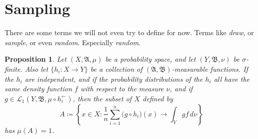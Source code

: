 \documentclass[
twoside=true,
paper=letter,
fontsize=11pt,
pagesize=auto,
leqno,
openany,
headsepline,
overfullrule,
]{scrbook}
\theoremstyle{plain}
\theoremstyle{plain}
\newtheorem{prop}[thm]{Proposition}
\theoremstyle{definition}
\theoremstyle{bfnoteitalic}
\theoremstyle{bfnoteroman}
\newcommand{\sigalg}[1]{\mathfrak{#1}}
\newcommand{\cali}[1]{\mathscr{#1}}
\newcommand{\definedby}{\coloneqq}
\newcommand{\textsigma}{\hbox{\large{$\sigma$}}\kern-1pt}
\newcommand{\preimage}[1]{#1^{\leftarrow}}
\newcommand{\sigmaalgebra}{\sigalg{A}}
\newcommand{\sigmaalgebraii}{\sigalg{B}}
\newcommand{\funcf}{f}
\newcommand{\funcg}{g}
\newcommand{\funch}{h}
\newcommand{\function}{f}
\newcommand{\functionii}{g}
\newcommand{\functioniii}{h}
\newcommand{\measurespace}{X}
\newcommand{\measurespaceii}{Y}
\newcommand{\mspaceelt}{x}
\newcommand{\measure}{\mu}
\newcommand{\measmu}{\mu}
\newcommand{\measnu}{\nu}
\newcommand{\seti}{A}
\begin{document}
\section{Sampling}
There are some terms we will not even try to define for now.
Terms like \emph{draw}, or \emph{sample}, or even \emph{random}. Especially \emph{random}.



\begin{prop}\label{sampling}
Let $(\measurespace,\sigmaalgebra,\measmu)$ be a probability space, and let 
$(\measurespaceii,\sigmaalgebraii,\measnu)$ be \textsigma-finite.
Also let
$\{ \funch_i:\measurespace\to\measurespaceii \}$ be a collection of 
$(\sigmaalgebra,\sigmaalgebraii)$\hyp{}measurable functions.
If the $\funch_i$ are independent, and if the probability distributions of the 
$\funch_i$ all have the same density function 
$\funcf$ 
with respect to the measure $\measnu$,
and if 
$\funcg\in
\cali{L}_1(\measurespaceii,\sigmaalgebraii,\measmu\circ\preimage{\funch_i})$,
then the subset of $\measurespace$ defined by
\[
\seti \definedby
\left\{ 
\mspaceelt\in\measurespace : 
\frac{1}{n} \sum_{i=1}^n \bigl( \functionii\circ \functioniii_i \bigr) (x) 
\to
\int_\measurespaceii \functionii \function \,d\measnu 
\right\}
\]
has $\measure(\seti) = 1$.
\end{prop}
\end{document}
